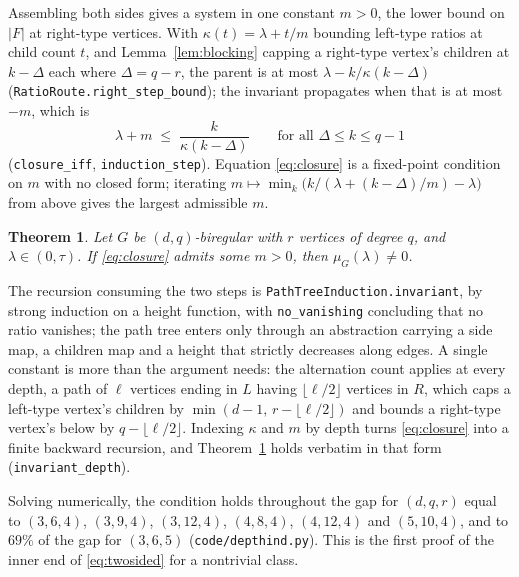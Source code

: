\documentclass[11pt]{article}
\newtheorem{theorem}{Theorem}
\theoremstyle{remark}
\begin{document}
Assembling both sides gives a system in one constant $m>0$, the lower bound on $|F|$ at
right-type vertices. With $\kappa(t)=\lambda+t/m$ bounding left-type ratios at child count $t$,
and Lemma~\ref{lem:blocking} capping a right-type vertex's children at $k-\Delta$ each where
$\Delta=q-r$, the parent is at most $\lambda-k/\kappa(k-\Delta)$
(\texttt{RatioRoute.right\_step\_bound}); the invariant propagates when that is at most $-m$,
which is
\begin{equation}\label{eq:closure}
   \lambda+m\;\le\;\frac{k}{\kappa(k-\Delta)}\qquad\text{for all }\Delta\le k\le q-1
\end{equation}
(\texttt{closure\_iff}, \texttt{induction\_step}). Equation \eqref{eq:closure} is a fixed-point
condition on $m$ with no closed form; iterating
$m\mapsto\min_k\bigl(k/(\lambda+(k-\Delta)/m)-\lambda\bigr)$ from above gives the largest
admissible $m$.

\begin{theorem}\label{thm:biregclass}
Let $G$ be $(d,q)$-biregular with $r$ vertices of degree $q$, and $\lambda\in(0,\tau)$. If
\eqref{eq:closure} admits some $m>0$, then $\mu_G(\lambda)\neq0$.
\end{theorem}

The recursion consuming the two steps is \texttt{PathTreeInduction.invariant}, by strong induction
on a height function, with \texttt{no\_vanishing} concluding that no ratio vanishes; the path tree
enters only through an abstraction carrying a side map, a children map and a height that strictly
decreases along edges. A single constant is more than the argument needs: the alternation count
applies at every depth, a path of $\ell$ vertices ending in $L$ having $\lfloor\ell/2\rfloor$
vertices in $R$, which caps a left-type vertex's children by
$\min(d-1,\,r-\lfloor\ell/2\rfloor)$ and bounds a right-type vertex's below by
$q-\lfloor\ell/2\rfloor$. Indexing $\kappa$ and $m$ by depth turns \eqref{eq:closure} into a
finite backward recursion, and Theorem~\ref{thm:biregclass} holds verbatim in that form
(\texttt{invariant\_depth}).

Solving numerically, the condition holds throughout the gap for $(d,q,r)$ equal to $(3,6,4)$,
$(3,9,4)$, $(3,12,4)$, $(4,8,4)$, $(4,12,4)$ and $(5,10,4)$, and to $69\%$ of the gap for
$(3,6,5)$ (\texttt{code/depthind.py}). This is the first proof of the inner end of
\eqref{eq:twosided} for a nontrivial class.
\end{document}
